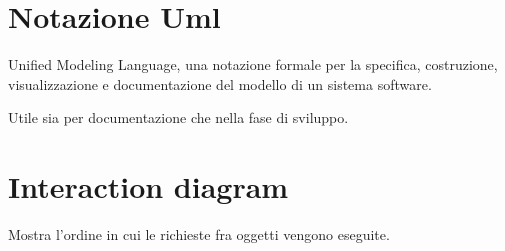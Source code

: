 \section{Notazione Uml}

Unified Modeling Language, una notazione formale per la specifica, costruzione, visualizzazione e documentazione del modello di un sistema software.

Utile sia per documentazione che nella fase di sviluppo.

\section{Interaction diagram}

Mostra l’ordine in cui le richieste fra oggetti vengono eseguite.